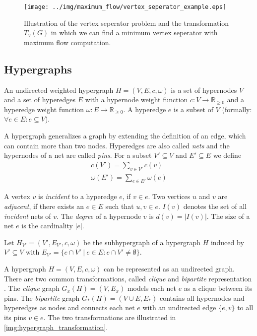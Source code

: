 \begin{figure}
\centering
\texttt{[image: ../img/maximum\_flow/vertex\_seperator\_example.eps]}
\caption{ Illustration of the vertex seperator problem and the transformation $T_V(G)$ in which
          we can find a minimum vertex seperator with maximum flow computation. }
\label{img:vertex_seperator_example}
\end{figure}

\subsection{Hypergraphs}
\label{sec:hypergraph}

\begin{definition}
An undirected weighted hypergraph $H = (V,E,c,\omega)$ is a set of hypernodes $V$ 
and a set of hyperedges $E$ with a hypernode weight function 
$c: V \rightarrow \mathbb{R}_{\ge 0}$ and a hyperedge weight 
function $\omega: E \rightarrow \mathbb{R}_{\ge 0}$. A hyperedge $e$ 
is a subset of $V$ (formally: $\forall e \in E: e \subseteq V$).
\label{def:hypergraph}
\end{definition}

A hypergraph generalizes a graph by extending the definition of an edge, which 
can contain more than two nodes. Hyperedges are also called \emph{nets} and the hypernodes
of a net are called \emph{pins}. For a subset $V' \subseteq V$ and $E' \subseteq E$ we
define
\begin{align*}
c(V') = \sum_{v \in V'} c(v) \\
\omega(E') = \sum_{e \in E'} \omega(e)
\end{align*}

A vertex $v$ is \emph{incident} to a hyperedge $e$, if $v \in e$.
Two vertices $u$ and $v$ are \emph{adjacent}, if there exists an 
$e \in E$ such that $u,v \in e$. $I(v)$ denotes the set of all 
\emph{incident} nets of $v$. The \emph{degree} of a hypernode 
$v$ is $d(v) = |I(v)|$. The size of a net $e$ is the cardinality $|e|$.

\begin{definition}
Let $H_{V'} = (V',E_{V'},c,\omega)$ be the subhypergraph of a hypergraph $H$
induced by $V' \subseteq V$ with $E_{V'} = \{e \cap V'\ |\ e \in E: e 
\cap V' \neq \emptyset\}$.
\label{def:subhypergraph}
\end{definition}

A hypergraph $H = (V,E,c,\omega)$ can be represented as an undirected graph. 
There are two common transformations, called \emph{clique} and \emph{bipartite} 
representation \cite{HuMoerder85}. The \emph{clique} graph $G_x(H) = (V,E_x)$ models
each net $e$ as a clique between its pins. The \emph{bipartite} graph $G_*(H) = 
(V \cup E, E_*)$ contains all hypernodes and hyperedges as nodes and connects each
net $e$ with an undirected edge $\{e,v\}$ to all its pins $v \in e$. The two transformations
are illustrated in \autoref{img:hypergraph_transformation}.

